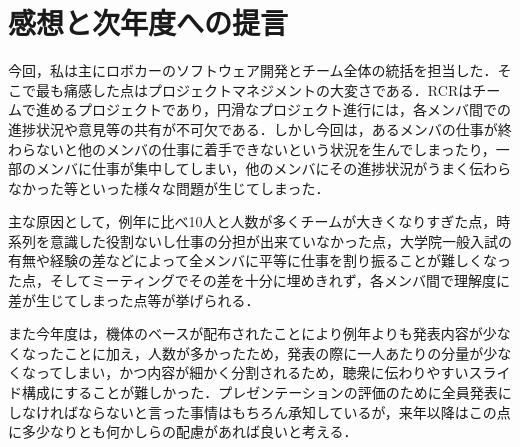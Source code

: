 \section{感想と次年度への提言}
今回，私は主にロボカーのソフトウェア開発とチーム全体の統括を担当した．そこで最も痛感した点はプロジェクトマネジメントの大変さである．RCRはチームで進めるプロジェクトであり，円滑なプロジェクト進行には，各メンバ間での進捗状況や意見等の共有が不可欠である．しかし今回は，あるメンバの仕事が終わらないと他のメンバの仕事に着手できないという状況を生んでしまったり，一部のメンバに仕事が集中してしまい，他のメンバにその進捗状況がうまく伝わらなかった等といった様々な問題が生じてしまった．

主な原因として，例年に比べ10人と人数が多くチームが大きくなりすぎた点，時系列を意識した役割ないし仕事の分担が出来ていなかった点，大学院一般入試の有無や経験の差などによって全メンバに平等に仕事を割り振ることが難しくなった点，そしてミーティングでその差を十分に埋めきれず，各メンバ間で理解度に差が生じてしまった点等が挙げられる．

また今年度は，機体のベースが配布されたことにより例年よりも発表内容が少なくなったことに加え，人数が多かったため，発表の際に一人あたりの分量が少なくなってしまい，かつ内容が細かく分割されるため，聴衆に伝わりやすいスライド構成にすることが難しかった．プレゼンテーションの評価のために全員発表にしなければならないと言った事情はもちろん承知しているが，来年以降はこの点に多少なりとも何かしらの配慮があれば良いと考える．